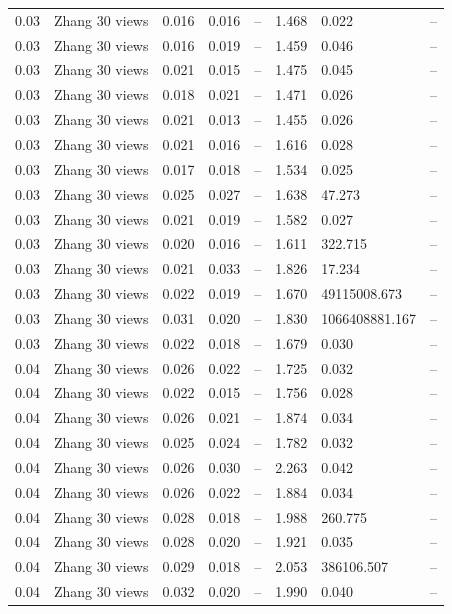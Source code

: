 \begin{table}[H]
\begin{tabular}{l c l l l}
0.03 & Zhang 30 views & 0.016 & 0.016 & -- & 1.468 & 0.022 & -- \\
0.03 & Zhang 30 views & 0.016 & 0.019 & -- & 1.459 & 0.046 & -- \\
0.03 & Zhang 30 views & 0.021 & 0.015 & -- & 1.475 & 0.045 & -- \\
0.03 & Zhang 30 views & 0.018 & 0.021 & -- & 1.471 & 0.026 & -- \\
0.03 & Zhang 30 views & 0.021 & 0.013 & -- & 1.455 & 0.026 & -- \\
0.03 & Zhang 30 views & 0.021 & 0.016 & -- & 1.616 & 0.028 & -- \\
0.03 & Zhang 30 views & 0.017 & 0.018 & -- & 1.534 & 0.025 & -- \\
0.03 & Zhang 30 views & 0.025 & 0.027 & -- & 1.638 & 47.273 & -- \\
0.03 & Zhang 30 views & 0.021 & 0.019 & -- & 1.582 & 0.027 & -- \\
0.03 & Zhang 30 views & 0.020 & 0.016 & -- & 1.611 & 322.715 & -- \\
0.03 & Zhang 30 views & 0.021 & 0.033 & -- & 1.826 & 17.234 & -- \\
0.03 & Zhang 30 views & 0.022 & 0.019 & -- & 1.670 & 49115008.673 & -- \\
0.03 & Zhang 30 views & 0.031 & 0.020 & -- & 1.830 & 1066408881.167 & -- \\
0.03 & Zhang 30 views & 0.022 & 0.018 & -- & 1.679 & 0.030 & -- \\
0.04 & Zhang 30 views & 0.026 & 0.022 & -- & 1.725 & 0.032 & -- \\
0.04 & Zhang 30 views & 0.022 & 0.015 & -- & 1.756 & 0.028 & -- \\
0.04 & Zhang 30 views & 0.026 & 0.021 & -- & 1.874 & 0.034 & -- \\
0.04 & Zhang 30 views & 0.025 & 0.024 & -- & 1.782 & 0.032 & -- \\
0.04 & Zhang 30 views & 0.026 & 0.030 & -- & 2.263 & 0.042 & -- \\
0.04 & Zhang 30 views & 0.026 & 0.022 & -- & 1.884 & 0.034 & -- \\
0.04 & Zhang 30 views & 0.028 & 0.018 & -- & 1.988 & 260.775 & -- \\
0.04 & Zhang 30 views & 0.028 & 0.020 & -- & 1.921 & 0.035 & -- \\
0.04 & Zhang 30 views & 0.029 & 0.018 & -- & 2.053 & 386106.507 & -- \\
0.04 & Zhang 30 views & 0.032 & 0.020 & -- & 1.990 & 0.040 & -- \\
\midrule

\end{tabular}
\end{table}
